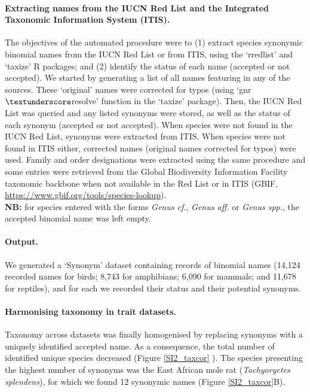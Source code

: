\paragraph{Extracting names from the IUCN Red List and the Integrated Taxonomic Information System (ITIS).}
The objectives of the automated procedure were to (1) extract species synonymic binomial names from the IUCN Red List or from ITIS, using the `rredlist' \citep{rredlist} and `taxize' \citep{Chamberlain2013} R packages; and (2) identify the status of each name (accepted or not accepted). We started by generating a list of all names featuring in any of the sources. These `original' names were corrected for typos (using `gnr$\textunderscore$resolve' function in the `taxize' package). Then, the IUCN Red List was queried and any listed synonyms were stored, as well as the status of each synonym (accepted or not accepted). When species were not found in the IUCN Red List, synonyms were extracted from ITIS. When species were not found in ITIS either, corrected names (original names corrected for typos) were used. Family and order designations were extracted using the same procedure and some entries were retrieved from the Global Biodiversity Information Facility taxonomic backbone when not available in the Red List or in ITIS (GBIF, \url{https://www.gbif.org/tools/species-lookup}).\\
\textbf{NB:} for species entered with the forms \textit{Genus cf.}, \textit{Genus aff.} or \textit{Genus spp.}, the accepted binomial name was left empty.

\paragraph{Output.} We generated a `Synonym' dataset containing records of binomial names (14,124 recorded names for birds; 8,743 for amphibians; 6,090 for mammals; and 11,678 for reptiles), and for each we recorded their status and their potential synonyms.


\paragraph{Harmonising taxonomy in trait datasets.}
Taxonomy across datasets was finally homogenised by replacing synonyms with a uniquely identified accepted name. As a consequence, the total number of identified unique species decreased (Figure \ref{SI2_taxcor} ). The species presenting the highest number of synonyms was the East African mole rat (\textit{Tachyoryctes splendens}), for which we found 12 synonymic names (Figure \ref{SI2_taxcor}B).

